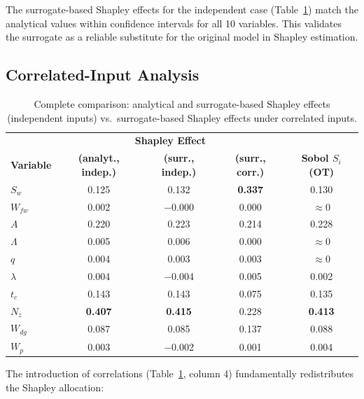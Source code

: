 \documentclass[11pt,a4paper]{article}
\begin{document}
The surrogate-based Shapley effects for the independent case (Table~\ref{tab:comparison}) match the analytical values within confidence intervals for all 10 variables. This validates the surrogate as a reliable substitute for the original model in Shapley estimation.

\subsection{Correlated-Input Analysis}

\begin{table}[H]
\centering
\caption{Complete comparison: analytical and surrogate-based Shapley effects (independent inputs) vs.\ surrogate-based Shapley effects under correlated inputs.}
\label{tab:comparison}
\begin{tabular}{lcccc}
\toprule
& \multicolumn{3}{c}{\textbf{Shapley Effect}} & \\
\textbf{Variable} & \textbf{(analyt., indep.)} & \textbf{(surr., indep.)} & \textbf{(surr., corr.)} & \textbf{Sobol $S_i$ (OT)} \\
\midrule
$S_w$   & 0.125 & 0.132 & \textbf{0.337} & 0.130 \\
$W_{fw}$ & 0.002 & $-$0.000 & 0.000 & $\approx 0$ \\
$A$     & 0.220 & 0.223 & 0.214 & 0.228 \\
$\Lambda$ & 0.005 & 0.006 & 0.000 & $\approx 0$ \\
$q$     & 0.004 & 0.003 & 0.003 & $\approx 0$ \\
$\lambda$ & 0.004 & $-$0.004 & 0.005 & 0.002 \\
$t_c$   & 0.143 & 0.143 & 0.075 & 0.135 \\
$N_z$   & \textbf{0.407} & \textbf{0.415} & 0.228 & \textbf{0.413} \\
$W_{dg}$ & 0.087 & 0.085 & 0.137 & 0.088 \\
$W_p$   & 0.003 & $-$0.002 & 0.001 & 0.004 \\
\bottomrule
\end{tabular}
\end{table}

The introduction of correlations (Table~\ref{tab:comparison}, column 4) fundamentally redistributes the Shapley allocation:
\end{document}
